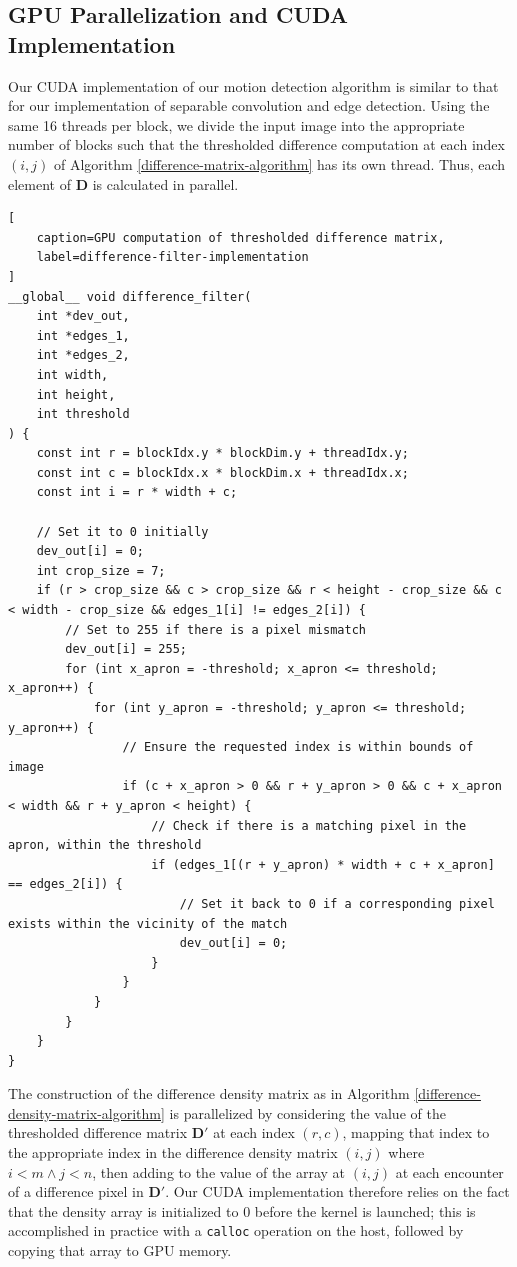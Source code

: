 \documentclass[journal]{IEEEtran}
\begin{document}
\subsection{GPU Parallelization and CUDA Implementation}
Our CUDA implementation of our motion detection algorithm is similar to that for our implementation of separable convolution and edge detection. Using the same 16 threads per block, we divide the input image into the appropriate number of blocks such that the thresholded difference computation at each index $(i, j)$ of Algorithm \ref{difference-matrix-algorithm} has its own thread. Thus, each element of $\boldsymbol{D}$ is calculated in parallel.
\begin{lstlisting}[
	caption=GPU computation of thresholded difference matrix,
	label=difference-filter-implementation
]
__global__ void difference_filter(
	int *dev_out,
	int *edges_1,
	int *edges_2,
	int width,
	int height,
	int threshold
) {
	const int r = blockIdx.y * blockDim.y + threadIdx.y;
	const int c = blockIdx.x * blockDim.x + threadIdx.x;
	const int i = r * width + c;

    // Set it to 0 initially
    dev_out[i] = 0;
    int crop_size = 7;
    if (r > crop_size && c > crop_size && r < height - crop_size && c < width - crop_size && edges_1[i] != edges_2[i]) {
        // Set to 255 if there is a pixel mismatch
        dev_out[i] = 255;
        for (int x_apron = -threshold; x_apron <= threshold; x_apron++) {
            for (int y_apron = -threshold; y_apron <= threshold; y_apron++) {
                // Ensure the requested index is within bounds of image
                if (c + x_apron > 0 && r + y_apron > 0 && c + x_apron < width && r + y_apron < height) {
                    // Check if there is a matching pixel in the apron, within the threshold
                    if (edges_1[(r + y_apron) * width + c + x_apron] == edges_2[i]) {
                        // Set it back to 0 if a corresponding pixel exists within the vicinity of the match
                        dev_out[i] = 0;
                    }
                }
            }
        }
    }
}
\end{lstlisting}
The construction of the difference density matrix as in Algorithm \ref{difference-density-matrix-algorithm} is parallelized by considering the value of the thresholded difference matrix $\boldsymbol{D}'$ at each index $(r, c)$, mapping that index to the appropriate index in the difference density matrix $(i, j)$ where $i < m \wedge j < n$, then adding to the value of the array at $(i, j)$ at each encounter of a difference pixel in $\boldsymbol{D}'$. Our CUDA implementation therefore relies on the fact that the density array is initialized to 0 before the kernel is launched; this is accomplished in practice with a \texttt{calloc} operation on the host, followed by copying that array to GPU memory.
\end{document}
